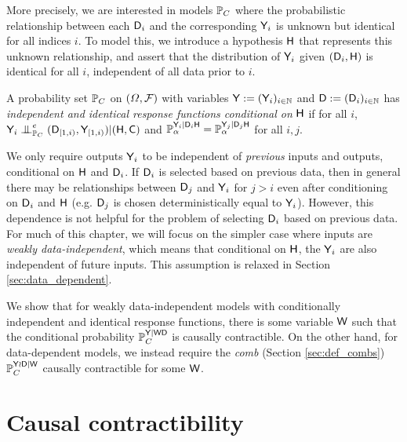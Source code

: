 More precisely, we are interested in models $\mathbb{P}_C$ where the probabilistic relationship between each $\mathsf{D}_i$ and the corresponding $\mathsf{Y}_i$ is unknown but identical for all indices $i$. To model this, we introduce a hypothesis $\mathsf{H}$ that represents this unknown relationship, and assert that the distribution of $\mathsf{Y}_i$ given $(\mathsf{D}_i,\mathsf{H})$ is identical for all $i$, independent of all data prior to $i$.

\begin{definition}\label{def:cii_rf}
A probability set $\mathbb{P}_C$ on $(\Omega,\mathcal{F})$ with variables $\mathsf{Y}:=(\mathsf{Y}_i)_{i\in \mathbb{N}}$ and $\mathsf{D}:=(\mathsf{D}_i)_{i\in\mathbb{N}}$ has \emph{independent and identical response functions conditional on} $\mathsf{H}$ if for all $i$, $\RV{Y}_i\CI^e_{\prob{P}_C} (\RV{D}_{[1,i)},\RV{Y}_{[1,i)})|(\RV{H},\RV{C})$ and $\mathbb{P}_\alpha^{\mathsf{Y}_i|\mathsf{D}_i\mathsf{H}}=\mathbb{P}_\alpha^{\mathsf{Y}_j|\mathsf{D}_j\mathsf{H}}$ for all $i,j$.
\end{definition}

We only require outputs $\mathsf{Y}_i$ to be independent of \emph{previous} inputs and outputs, conditional on $\mathsf{H}$ and $\mathsf{D}_i$. If $\mathsf{D}_i$ is selected based on previous data, then in general there may be relationships between $\mathsf{D}_j$ and $\mathsf{Y}_i$ for $j>i$ even after conditioning on $\mathsf{D}_i$ and $\mathsf{H}$ (e.g. $\mathsf{D}_j$ is chosen deterministically equal to $\mathsf{Y}_i$). However, this dependence is not helpful for the problem of selecting $\mathsf{D}_i$ based on previous data. For much of this chapter, we will focus on the simpler case where inputs are \emph{weakly data-independent}, which means that conditional on $\mathsf{H}$, the $\mathsf{Y}_i$ are also independent of future inputs. This assumption is relaxed in Section \ref{sec:data_dependent}.

We show that for weakly data-independent models with conditionally independent and identical response functions, there is some variable $\mathsf{W}$ such that the conditional probability $\mathbb{P}_C^{\mathsf{Y}|\mathsf{WD}}$ is causally contractible. On the other hand, for data-dependent models, we instead require the \emph{comb} (Section \ref{sec:def_combs}) $\mathbb{P}_C^{\mathsf{Y}\wr \mathsf{D}|\mathsf{W}}$ causally contractible for some $\mathsf{W}$.


\section[Causal contractibility]{Causal contractibility}\label{sec:ccontracibility}

